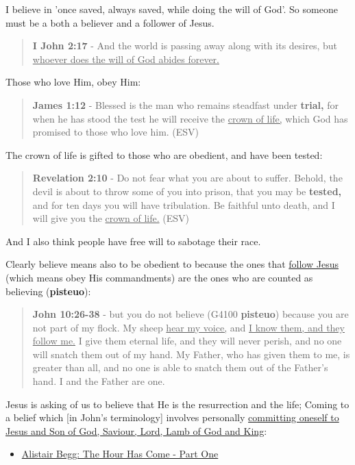\documentclass[11pt]{article}
\begin{document}
I believe in 'once saved, always saved, while doing the will of God'. So someone must be a both a believer and a follower of Jesus.

\begin{quote}
\textbf{I John 2:17} - And the world is passing away along with its desires, but \uline{whoever does the will of God abides forever.}
\end{quote}

Those who love Him, obey Him:

\begin{quote}
\textbf{James 1:12} - Blessed is the man who remains steadfast under \textbf{trial,} for when he has stood the test he will receive the \uline{crown of life,} which God has promised to those who love him. (ESV)
\end{quote}

The crown of life is gifted to those who are obedient, and have been tested:

\begin{quote}
\textbf{Revelation 2:10} - Do not fear what you are about to suffer. Behold, the devil is about to throw some of you into prison, that you may be \textbf{tested,} and for ten days you will have tribulation. Be faithful unto death, and I will give you the \uline{crown of life.} (ESV)
\end{quote}

And I also think people have free will to sabotage their race.

Clearly believe means also to be obedient to because the ones that \uline{follow Jesus} (which means obey His commandments) are the ones who are counted as believing (\textbf{pisteuo}):

\begin{quote}
\textbf{John 10:26-38} - but you do not believe (G4100 \textbf{pisteuo}) because you are not part of my flock. My sheep \uline{hear my voice,} and \uline{I know them, and they follow me.} I give them eternal life, and they will never perish, and no one will snatch them out of my hand. My Father, who has given them to me, is greater than all, and no one is able to snatch them out of the Father's hand. I and the Father are one.
\end{quote}

Jesus is asking of us to believe that He is the resurrection and the life; Coming to a belief which [in John's terminology] involves personally \uline{committing oneself to Jesus and Son of God, Saviour, Lord, Lamb of God and King}:
\begin{itemize}
\item \href{https://www.youtube.com/watch?v=DgcN1Qc2kJg}{Alistair Begg: The Hour Has Come - Part One}
\end{itemize}
\end{document}
